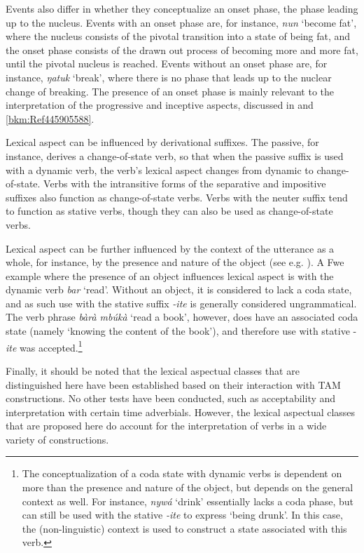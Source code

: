 Events also differ in whether they conceptualize an onset phase, the phase leading up to the nucleus. Events with an onset phase are, for instance, \textit{nun} ‘become fat’, where the nucleus consists of the pivotal transition into a state of being fat, and the onset phase consists of the drawn out process of becoming more and more fat, until the pivotal nucleus is reached. Events without an onset phase are, for instance, \textit{ŋatuk} ‘break’, where there is no phase that leads up to the nuclear change of breaking. The presence of an onset phase is mainly relevant to the interpretation of the progressive and inceptive aspects, discussed in  and \ref{bkm:Ref445905588}.

Lexical aspect can be influenced by derivational suffixes. The passive, for instance, derives a change-of-state verb, so that when the passive suffix is used with a dynamic verb, the verb’s lexical aspect changes from dynamic to change-of-state. Verbs with the intransitive forms of the separative and impositive suffixes also function as change-of-state verbs. Verbs with the neuter suffix tend to function as stative verbs, though they can also be used as change-of-state verbs.

Lexical aspect can be further influenced by the context of the utterance as a whole, for instance, by the presence and nature of the object (see e.g. \citealt{Verkuyl1972}). A Fwe example where the presence of an object influences lexical aspect is with the dynamic verb \textit{bar} ‘read’. Without an object, it is considered to lack a coda state, and as such use with the stative suffix \textit{-ite} is generally considered ungrammatical. The verb phrase \textit{bàrà mbúkà} ‘read a book’, however, does have an associated coda state (namely ‘knowing the content of the book’), and therefore use with stative -\textit{ite} was accepted.\footnote{The conceptualization of a coda state with dynamic verbs is dependent on more than the presence and nature of the object, but depends on the general context as well. For instance, \textit{nywá} ‘drink’ essentially lacks a coda phase, but can still be used with the stative \textit{-ite} to express ‘being drunk’. In this case, the (non-linguistic) context is used to construct a state associated with this verb.}

Finally, it should be noted that the lexical aspectual classes that are distinguished here have been established based on their interaction with TAM constructions. No other tests have been conducted, such as acceptability and interpretation with certain time adverbials. However, the lexical aspectual classes that are proposed here do account for the interpretation of verbs in a wide variety of constructions.

